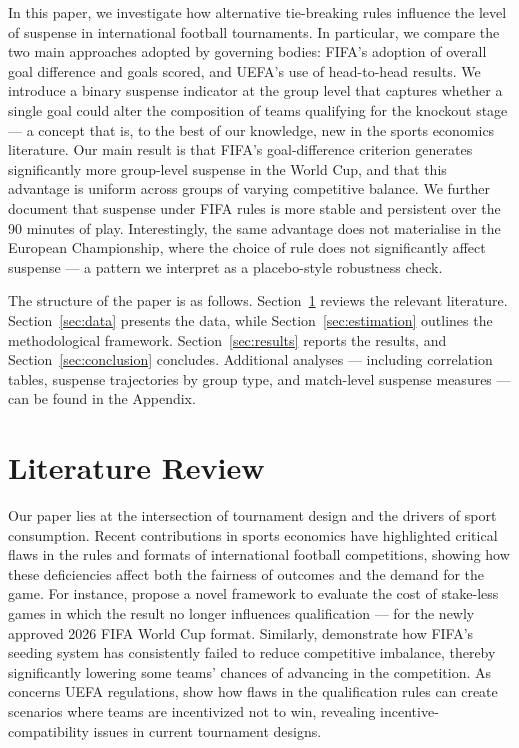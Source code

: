 \documentclass[11pt]{article}
\begin{document}
In this paper, we investigate how alternative tie-breaking rules influence the level of suspense in international football tournaments. In particular, we compare the two main approaches adopted by governing bodies: FIFA's adoption of overall goal difference and goals scored, and UEFA's use of head-to-head results. We introduce a binary suspense indicator at the group level that captures whether a single goal could alter the composition of teams qualifying for the knockout stage — a concept that is, to the best of our knowledge, new in the sports economics literature. Our main result is that FIFA's goal-difference criterion generates significantly more group-level suspense in the World Cup, and that this advantage is uniform across groups of varying competitive balance. We further document that suspense under FIFA rules is more stable and persistent over the 90 minutes of play. Interestingly, the same advantage does not materialise in the European Championship, where the choice of rule does not significantly affect suspense — a pattern we interpret as a placebo-style robustness check.

\vspace{0.5em}

The structure of the paper is as follows. Section~\ref{sec:literature} reviews the relevant literature. Section~\ref{sec:data} presents the data, while Section~\ref{sec:estimation} outlines the methodological framework. Section~\ref{sec:results} reports the results, and Section~\ref{sec:conclusion} concludes. Additional analyses — including correlation tables, suspense trajectories by group type, and match-level suspense measures — can be found in the Appendix.

\section{Literature Review}
\label{sec:literature}

Our paper lies at the intersection of tournament design and the drivers of sport consumption. Recent contributions in sports economics have highlighted critical flaws in the rules and formats of international football competitions, showing how these deficiencies affect both the fairness of outcomes and the demand for the game. For instance, \citet{csato2025increasing} propose a novel framework to evaluate the cost of stake-less games in which the result no longer influences qualification — for the newly approved 2026 FIFA World Cup format. Similarly, \citet{lapre2023evolution, lapre2022quantifying} demonstrate how FIFA's seeding system has consistently failed to reduce competitive imbalance, thereby significantly lowering some teams' chances of advancing in the competition. As concerns UEFA regulations, \citet{csato2020neither} show how flaws in the qualification rules can create scenarios where teams are incentivized not to win, revealing incentive-compatibility issues in current tournament designs.
\end{document}
